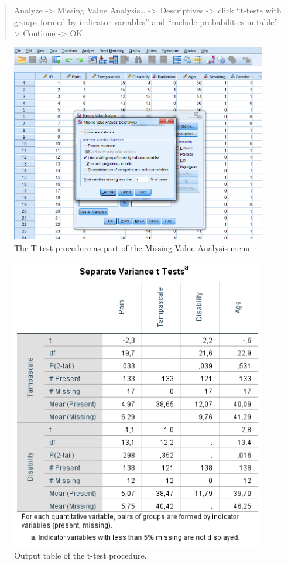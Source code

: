 \documentclass[]{book}
\begin{document}
\begin{quote}
Analyze -\textgreater{} Missing Value Analysis\ldots{} -\textgreater{}
Descriptives -\textgreater{} click ``t-tests with groups formed by
indicator variables'' and ``include probabilities in table''
-\textgreater{} Continue -\textgreater{} OK.
\end{quote}

\begin{figure}

{\centering \includegraphics[width=0.9\linewidth]{images/fig2.11} 

}

\caption{The T-test procedure as part of the Missing Value Analysis menu}\label{fig:fig2-11}
\end{figure}

\begin{figure}

{\centering \includegraphics[width=0.9\linewidth]{images/tab2.5} 

}

\caption{Output table of the t-test procedure.}\label{fig:tab2-5}
\end{figure}
\end{document}
